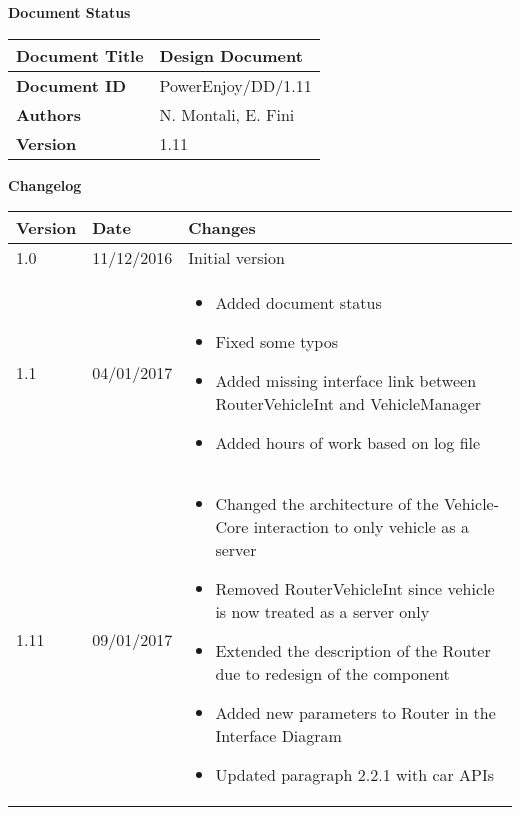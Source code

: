 \textbf{\Huge Document Status}
\begin{center}
    \begin{tabular}{ | l | p{10cm} |}
    \hline
    \textbf{Document Title} & Design Document \\ \hline
    \textbf{Document ID} & PowerEnjoy/DD/1.11 \\ \hline
    \textbf{Authors} & N. Montali, E. Fini \\ \hline
    \textbf{Version} & 1.11 \\ \hline
    \end{tabular}
\textbf{\Large Changelog}
     \begin{tabular}{ | l | l | p{10cm} |}
    \hline
    \textbf{Version} & \textbf{Date} & \textbf{Changes} \\ \hline
    1.0 & 11/12/2016 & Initial version \\ \hline
    1.1 & 04/01/2017 & \begin{itemize}
    	\item Added document status 
	\item Fixed some typos
	\item Added missing interface link between RouterVehicleInt and VehicleManager
	\item Added hours of work based on log file
    \end{itemize}
    \\ \hline
    1.11 & 09/01/2017 & \begin{itemize}
    	\item Changed the architecture of the Vehicle-Core interaction to only vehicle as a server
	\item Removed RouterVehicleInt since vehicle is now treated as a server only
	\item Extended the description of the Router due to redesign of the component
	\item Added new parameters to Router in the Interface Diagram 
	\item Updated paragraph 2.2.1 with car APIs
    \end{itemize}
    \\ \hline
    \end{tabular}
\end{center}
